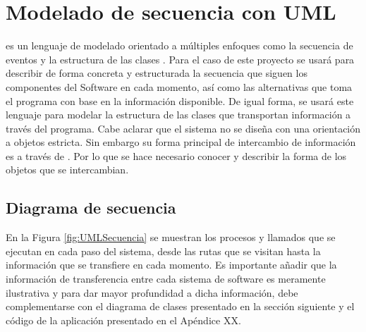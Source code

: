 \section{Modelado de secuencia con UML}
\UML es un lenguaje de modelado orientado a múltiples enfoques como la secuencia de eventos y la estructura de las clases \citep{10.1145/1125944.1125949}. Para el caso de este proyecto se usará para describir de forma concreta y estructurada la secuencia que siguen los componentes del Software en cada momento, así como las alternativas que toma el programa con base en la información disponible. De igual forma, se usará este lenguaje para modelar la estructura de las clases que transportan información a través del programa. Cabe aclarar que el sistema no se diseña con una orientación a objetos estricta. Sin embargo su forma principal de intercambio de información es a través de \JSON. Por lo que se hace necesario conocer y describir la forma de los objetos que se intercambian.

\subsection{Diagrama de secuencia}
\noindent
En la Figura \ref{fig:UMLSecuencia} se muestran los procesos y llamados que se ejecutan en cada paso del sistema, desde las rutas que se visitan hasta la información que se transfiere en cada momento. Es importante añadir que la información de transferencia entre cada sistema de software es meramente ilustrativa y para dar mayor profundidad a dicha información, debe complementarse con el diagrama de clases presentado en la sección siguiente y el código de la aplicación presentado en el Apéndice XX.

